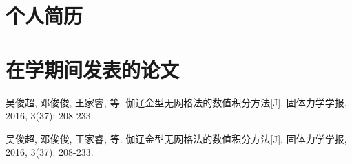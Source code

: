\begin{cv}
    \section*{个人简历}
    \section*{在学期间发表的论文}
    \begin{enumerate}[{[1]}]
        \item 吴俊超, 邓俊俊, 王家睿, 等. 伽辽金型无网格法的数值积分方法[J]. 固体力学学报, 2016, 3(37): 208-233. 
        \item 吴俊超, 邓俊俊, 王家睿, 等. 伽辽金型无网格法的数值积分方法[J]. 固体力学学报, 2016, 3(37): 208-233. 
    \end{enumerate}
\end{cv}
